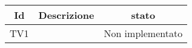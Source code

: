 \begin{center}
	\begin{longtable}{|c|>{\centering}m{10cm}|c|}\hline
		Id & Descrizione & stato \\ \hline
		TV1 &  & Non implementato \\ \hline
	\end{longtable}
\end{center}
